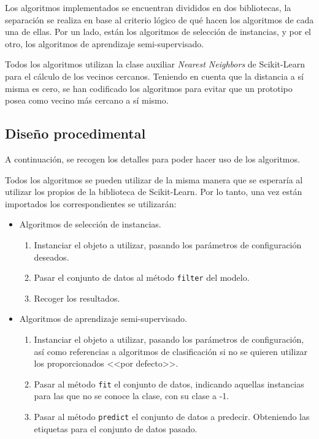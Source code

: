 Los algoritmos implementados se encuentran divididos en dos bibliotecas, la separación se realiza en base al criterio lógico de qué hacen los algoritmos de cada una de ellas. Por un lado, están los algoritmos de selección de instancias, y por el otro, los algoritmos de aprendizaje semi-supervisado.

Todos los algoritmos utilizan la clase auxiliar \textit{Nearest Neighbors} de Scikit-Learn~\cite{NearestNeighbors} para el cálculo de los vecinos cercanos. Teniendo en cuenta que la distancia a sí misma es cero, se han codificado los algoritmos para evitar que un prototipo posea como vecino más cercano a sí mismo.

\subsection{Diseño procedimental}
A continuación, se recogen los detalles para poder hacer uso de los algoritmos.

Todos los algoritmos se pueden utilizar de la misma manera que se esperaría al utilizar los propios de la biblioteca de Scikit-Learn. Por lo tanto, una vez están importados los correspondientes se utilizarán:
\begin{itemize}
\item Algoritmos de selección de instancias.
\begin{enumerate}
	\item Instanciar el objeto a utilizar, pasando los parámetros de configuración deseados.
	\item Pasar el conjunto de datos al método \texttt{filter} del modelo.
	\item Recoger los resultados.
\end{enumerate}
\item Algoritmos de aprendizaje semi-supervisado.
\begin{enumerate}
\item Instanciar el objeto a utilizar, pasando los parámetros de configuración, así como referencias a algoritmos de clasificación si no se quieren utilizar los proporcionados <<por defecto>>.
\item Pasar al método \texttt{fit} el conjunto de datos, indicando aquellas instancias para las que no se conoce la clase, con su clase a -1.
\item Pasar al método \texttt{predict} el conjunto de datos a predecir. Obteniendo las etiquetas para el conjunto de datos pasado.
\end{enumerate}
\end{itemize}

